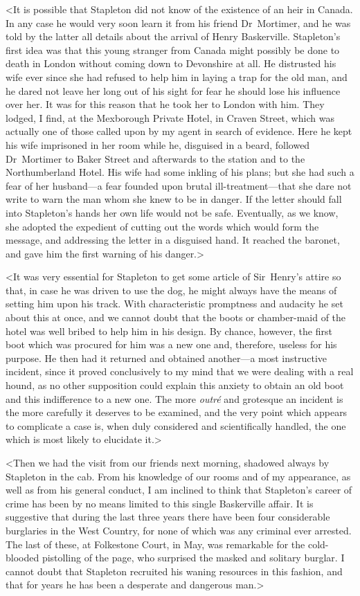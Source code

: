 <It is possible that Stapleton did not know of the existence of an heir in Canada. In any case he would very soon learn it from his friend Dr~Mortimer, and he was told by the latter all details about the arrival of Henry Baskerville. Stapleton's first idea was that this young stranger from Canada might possibly be done to death in London without coming down to Devonshire at all. He distrusted his wife ever since she had refused to help him in laying a trap for the old man, and he dared not leave her long out of his sight for fear he should lose his influence over her. It was for this reason that he took her to London with him. They lodged, I find, at the Mexborough Private Hotel, in Craven Street, which was actually one of those called upon by my agent in search of evidence. Here he kept his wife imprisoned in her room while he, disguised in a beard, followed Dr~Mortimer to Baker Street and afterwards to the station and to the Northumberland Hotel. His wife had some inkling of his plans; but she had such a fear of her husband—a fear founded upon brutal ill-treatment—that she dare not write to warn the man whom she knew to be in danger. If the letter should fall into Stapleton's hands her own life would not be safe. Eventually, as we know, she adopted the expedient of cutting out the words which would form the message, and addressing the letter in a disguised hand. It reached the baronet, and gave him the first warning of his danger.>

<It was very essential for Stapleton to get some article of Sir~Henry's attire so that, in case he was driven to use the dog, he might always have the means of setting him upon his track. With characteristic promptness and audacity he set about this at once, and we cannot doubt that the boots or chamber-maid of the hotel was well bribed to help him in his design. By chance, however, the first boot which was procured for him was a new one and, therefore, useless for his purpose. He then had it returned and obtained another—a most instructive incident, since it proved conclusively to my mind that we were dealing with a real hound, as no other supposition could explain this anxiety to obtain an old boot and this indifference to a new one. The more \textit{outré} and grotesque an incident is the more carefully it deserves to be examined, and the very point which appears to complicate a case is, when duly considered and scientifically handled, the one which is most likely to elucidate it.>

<Then we had the visit from our friends next morning, shadowed always by Stapleton in the cab. From his knowledge of our rooms and of my appearance, as well as from his general conduct, I am inclined to think that Stapleton's career of crime has been by no means limited to this single Baskerville affair. It is suggestive that during the last three years there have been four considerable burglaries in the West Country, for none of which was any criminal ever arrested. The last of these, at Folkestone Court, in May, was remarkable for the cold-blooded pistolling of the page, who surprised the masked and solitary burglar. I cannot doubt that Stapleton recruited his waning resources in this fashion, and that for years he has been a desperate and dangerous man.>


